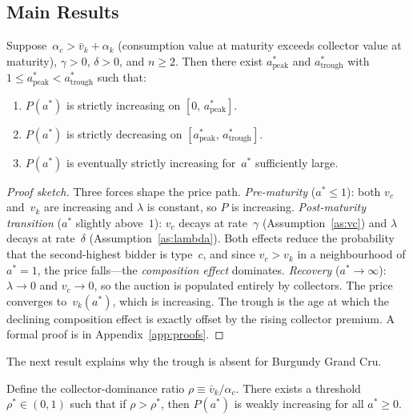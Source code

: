 \subsection{Main Results}
\label{sec:model:results}

\begin{proposition}
\label{prop:nonmono}
Suppose\, $\alpha_{c} > \bar{v}_{k} + \alpha_{k}$
(consumption value at maturity exceeds collector value at maturity),
$\gamma > 0$, $\delta > 0$, and $n \geq 2$.  Then there exist
$a^{*}_{\mathrm{peak}}$ and $a^{*}_{\mathrm{trough}}$ with
$1 \leq a^{*}_{\mathrm{peak}} < a^{*}_{\mathrm{trough}}$ such that:
\begin{enumerate}
  \item[\emph{(i)}]
    $P(a^{*})$ is strictly increasing on
    $[0,\, a^{*}_{\mathrm{peak}}]$.
  \item[\emph{(ii)}]
    $P(a^{*})$ is strictly decreasing on
    $[a^{*}_{\mathrm{peak}},\, a^{*}_{\mathrm{trough}}]$.
  \item[\emph{(iii)}]
    $P(a^{*})$ is eventually strictly increasing for~$a^{*}$
    sufficiently large.
\end{enumerate}
\end{proposition}

\begin{proof}[Proof sketch]
Three forces shape the price path.
\emph{Pre-maturity} ($a^{*} \leq 1$): both $v_{c}$ and~$v_{k}$ are
increasing and $\lambda$ is constant, so $P$ is increasing.
\emph{Post-maturity transition} ($a^{*}$ slightly above~$1$):
$v_{c}$ decays at rate~$\gamma$ (Assumption~\ref{as:vc}) and
$\lambda$ decays at rate~$\delta$ (Assumption~\ref{as:lambda}).
Both effects reduce the probability that the second-highest bidder
is type~$c$, and since $v_{c} > v_{k}$ in a neighbourhood of
$a^{*} = 1$, the price falls---the \emph{composition effect}
dominates.
\emph{Recovery} ($a^{*} \to \infty$): $\lambda \to 0$ and
$v_{c} \to 0$, so the auction is populated entirely by collectors.
The price converges to~$v_{k}(a^{*})$, which is increasing.
The trough is the age at which the declining composition effect is
exactly offset by the rising collector premium.
A formal proof is in Appendix~\ref{app:proofs}.
\end{proof}

\medskip

The next result explains why the trough is absent for Burgundy Grand
Cru.

\begin{proposition}
\label{prop:notrough}
Define the collector-dominance ratio
$\rho \equiv \bar{v}_{k} / \alpha_{c}$.
There exists a threshold~$\rho^{*} \in (0,1)$ such that if
$\rho > \rho^{*}$, then $P(a^{*})$ is weakly increasing for all
$a^{*} \geq 0$.
\end{proposition}

